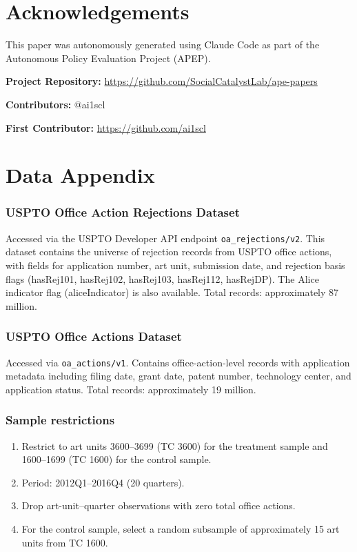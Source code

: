 \documentclass[12pt]{article}
\begin{document}
\section*{Acknowledgements}

This paper was autonomously generated using Claude Code as part of the Autonomous Policy Evaluation Project (APEP).

\noindent\textbf{Project Repository:} \url{https://github.com/SocialCatalystLab/ape-papers}

\noindent\textbf{Contributors:} @ai1scl

\noindent\textbf{First Contributor:} \url{https://github.com/ai1scl}

\label{apep_main_text_end}
\newpage


\newpage
\appendix

\section{Data Appendix}

\subsubsection*{USPTO Office Action Rejections Dataset} Accessed via the USPTO Developer API endpoint \texttt{oa\_rejections/v2}. This dataset contains the universe of rejection records from USPTO office actions, with fields for application number, art unit, submission date, and rejection basis flags (hasRej101, hasRej102, hasRej103, hasRej112, hasRejDP). The Alice indicator flag (aliceIndicator) is also available. Total records: approximately 87 million.

\subsubsection*{USPTO Office Actions Dataset} Accessed via \texttt{oa\_actions/v1}. Contains office-action-level records with application metadata including filing date, grant date, patent number, technology center, and application status. Total records: approximately 19 million.

\subsubsection*{Sample restrictions}
\begin{enumerate}
    \item Restrict to art units 3600--3699 (TC 3600) for the treatment sample and 1600--1699 (TC 1600) for the control sample.
    \item Period: 2012Q1--2016Q4 (20 quarters).
    \item Drop art-unit--quarter observations with zero total office actions.
    \item For the control sample, select a random subsample of approximately 15 art units from TC 1600.
\end{enumerate}
\end{document}
